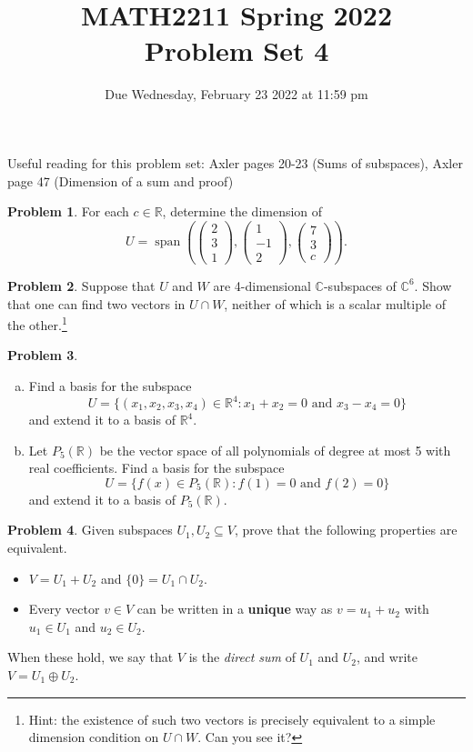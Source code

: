 \documentclass[11pt,oneside]{amsart}
\title{MATH2211 Spring 2022\\
Problem Set 4}
\author{Due Wednesday, February 23 2022 at 11:59 pm}
\theoremstyle{definition}
\newtheorem{problem}{Problem}
\newcommand{\bC}{\mathbb{C}}
\newcommand{\bR}{\mathbb{R}}
\newcommand*\dcolvec[1]{\begin{pmatrix}#1\end{pmatrix}}
\DeclareMathOperator{\Span}{span}
\begin{document}
    \maketitle

    Useful reading for this problem set: Axler pages 20-23 (Sums of subspaces), Axler page 47 (Dimension of a sum and proof)

    \begin{problem}
        For each $c\in\bR$, determine the dimension of
        \[U=\Span\left( \dcolvec{2\\3\\1},\dcolvec{1\\-1\\2},\dcolvec{7\\3\\c} \right).\]
    \end{problem}

    \begin{problem}
        Suppose that $U$ and $W$ are 4-dimensional $\bC$-subspaces of $\bC^6$. Show that one can find two vectors in $U\cap W$, neither of which is a scalar multiple of the other.\footnote{Hint: the existence of such two vectors is precisely equivalent to a simple dimension condition on $U\cap W$. Can you see it?}
    \end{problem}

    \begin{problem}
        \leavevmode\begin{enumerate}[(a)]
            \item Find a basis for the subspace
            \[U=\{(x_1,x_2,x_3,x_4)\in\bR^4:x_1+x_2=0\text{ and }x_3-x_4=0\}\]
            and extend it to a basis of $\bR^4$.

            \item Let $P_5(\bR)$ be the vector space of all polynomials of degree at most 5 with real coefficients. Find a basis for the subspace
            \[U=\{f(x)\in P_5(\bR):f(1)=0\text{ and }f(2)=0\}\]
            and extend it to a basis of $P_5(\bR)$.
        \end{enumerate}
    \end{problem}

    \begin{problem}
        Given subspaces $U_1,U_2\subseteq V$, prove that the following properties are equivalent.
        \begin{itemize}
            \item $V=U_1+U_2$ and $\{0\}=U_1\cap U_2$.
            \item Every vector $v\in V$ can be written in a \textbf{unique} way as $v=u_1+u_2$ with $u_1\in U_1$ and $u_2\in U_2$.
        \end{itemize}
        When these hold, we say that $V$ is the \emph{direct sum} of $U_1$ and $U_2$, and write $V=U_1\oplus U_2$.
    \end{problem}
\end{document}
